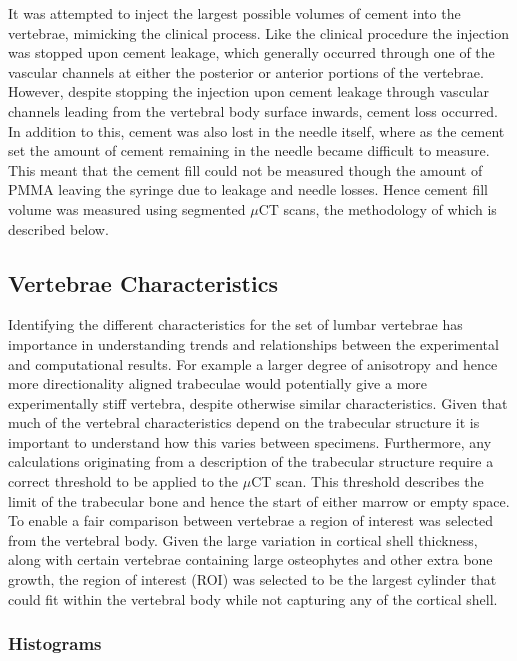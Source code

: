 It was attempted to inject the largest possible volumes of cement into the
vertebrae, mimicking the clinical process.
Like the clinical procedure the injection was stopped upon cement leakage,
which generally occurred through one of the vascular channels at either the
posterior or anterior portions of the vertebrae.
However, despite stopping the injection upon cement leakage through vascular
channels leading from the vertebral body surface inwards, cement loss
occurred.
In addition to this, cement was also lost in the needle itself, where as the
cement set the amount of cement remaining in the needle became difficult to
measure.
This meant that the cement fill could not be measured though the amount of PMMA
leaving the syringe due to leakage and needle losses.
Hence cement fill volume was measured using segmented $\mu$CT scans, the
methodology of which is described below.

\subsection{Vertebrae Characteristics}

Identifying the different characteristics for the set of lumbar vertebrae has
importance in understanding trends and relationships between the experimental
and computational results. For example a larger degree of anisotropy and hence
more directionality aligned trabeculae would potentially give a more
experimentally stiff vertebra, despite otherwise similar characteristics. Given
that much of the vertebral characteristics depend on the trabecular structure
it
is important to understand how this varies between specimens. Furthermore, any
calculations originating from a description of the trabecular structure require
a correct threshold to be applied to the $\mu$CT scan. This threshold describes
the limit of the trabecular bone and hence the start of either marrow or empty
space. To enable a fair comparison between vertebrae a region of interest was
selected from the vertebral body. Given the large variation in cortical shell
thickness, along with certain vertebrae containing large osteophytes and other
extra bone growth, the region of interest (ROI) was selected to be the largest
cylinder that could fit within the vertebral body while not capturing any of
the
cortical shell.

\subsubsection{Histograms}

